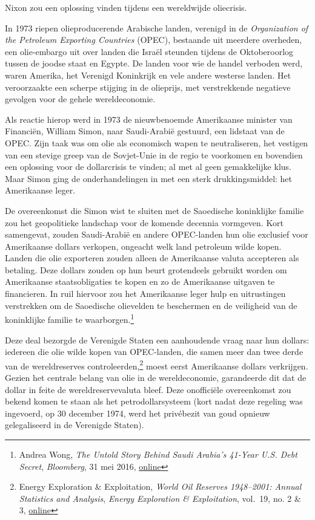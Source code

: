 \documentclass[
  a5paper,
  smalldemyvopaper,11pt,twoside,onecolumn,openright,extrafontsizes,
hidelinks]{memoir}
\begin{document}
Nixon zou een oplossing vinden tijdens een wereldwijde oliecrisis.

In 1973 riepen olieproducerende Arabische landen, verenigd in de
\emph{Organization of the Petroleum Exporting Countries} (OPEC),
bestaande uit meerdere overheden, een olie-embargo uit over landen die
Israël steunden tijdens de Oktoberoorlog tussen de joodse staat en
Egypte. De landen voor wie de handel verboden werd, waren Amerika, het
Verenigd Koninkrijk en vele andere westerse landen. Het veroorzaakte een
scherpe stijging in de olieprijs, met verstrekkende negatieve gevolgen
voor de gehele wereldeconomie.

Als reactie hierop werd in 1973 de nieuwbenoemde Amerikaanse minister
van Financiën, William Simon, naar Saudi-Arabië gestuurd, een lidstaat
van de OPEC. Zijn taak was om olie als economisch wapen te
neutraliseren, het vestigen van een stevige greep van de Sovjet-Unie in
de regio te voorkomen en bovendien een oplossing voor de dollarcrisis te
vinden; al met al geen gemakkelijke klus. Maar Simon ging de
onderhandelingen in met een sterk drukkingsmiddel: het Amerikaanse
leger.

De overeenkomst die Simon wist te sluiten met de Saoedische koninklijke
familie zou het geopolitieke landschap voor de komende decennia
vormgeven. Kort samengevat, zouden Saudi-Arabië en andere OPEC-landen
hun olie exclusief voor Amerikaanse dollars verkopen, ongeacht welk land
petroleum wilde kopen. Landen die olie exporteren zouden alleen de
Amerikaanse valuta accepteren als betaling. Deze dollars zouden op hun
beurt grotendeels gebruikt worden om Amerikaanse staatsobligaties te
kopen en zo de Amerikaanse uitgaven te financieren. In ruil hiervoor zou
het Amerikaanse leger hulp en uitrustingen verstrekken om de Saoedische
olievelden te beschermen en de veiligheid van de koninklijke familie te
waarborgen.\footnote{Andrea Wong, \emph{The Untold Story Behind Saudi
  Arabia's 41-Year U.S. Debt Secret}, \emph{Bloomberg}, 31 mei 2016,
  \href{https://www.bloomberg.com/news/features/2016-05-30/the-untold-story-behind-saudi-arabia-s-41-year-u-s-debt-secret}{online}}

Deze deal bezorgde de Verenigde Staten een aanhoudende vraag naar hun
dollars: iedereen die olie wilde kopen van OPEC-landen, die samen meer
dan twee derde van de wereldreserves controleerden,\footnote{Energy
  Exploration \& Exploitation, \emph{World Oil Reserves 1948--2001:
  Annual Statistics and Analysis}, \emph{Energy Exploration \&
  Exploitation}, vol.~19, no. 2 \& 3,
  \href{https://journals.sagepub.com/doi/pdf/10.1260/0144598011492561}{online}}
moest eerst Amerikaanse dollars verkrijgen. Gezien het centrale belang
van olie in de wereldeconomie, garandeerde dit dat de dollar in feite de
wereldreservevaluta bleef. Deze onofficiële overeenkomst zou bekend
komen te staan als het petrodollarsysteem (kort nadat deze regeling was
ingevoerd, op 30 december 1974, werd het privébezit van goud opnieuw
gelegaliseerd in de Verenigde Staten).
\end{document}
